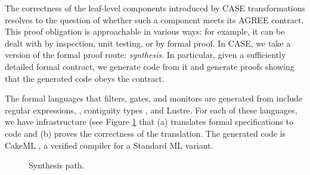 The correctness of the leaf-level components introduced by CASE
transformations resolves to the question of whether such a component
meets its AGREE contract. This proof obligation is approachable in
various ways: for example, it can be dealt with by inspection, unit
testing, or by formal proof. In CASE, we take a version of the formal
proof route: \emph{synthesis}. In particular, given a sufficiently
detailed formal contract, we generate code from it and generate proofs
showing that the generated code obeys the contract.

The formal languages that filters, gates, and monitors are generated
from include regular expressions, \cite{case-verified-filter},
contiguity types \cite{contiguity-types}, and Lustre. For each of
these languages, we have infrastructure (see Figure
\ref{fig:synthesis} that (a) translates formal specifications to code
and (b) proves the correctness of the translation. The generated code
is CakeML \cite{cakeml}, a verified compiler for a Standard ML
variant.

\begin{figure}[h]
\begin{center}
\end{center}
\caption{Synthesis path.\label{fig:synthesis}}
\end{figure}
